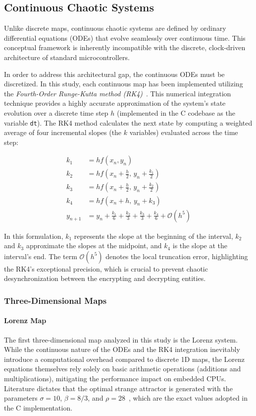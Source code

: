 \documentclass[11pt,a4paper]{report}
\begin{document}
\subsection{Continuous Chaotic Systems}
Unlike discrete maps, continuous chaotic systems are defined by ordinary differential equations (ODEs) that evolve seamlessly over continuous time. 
This conceptual framework is inherently incompatible with the discrete, clock-driven architecture of standard microcontrollers.

In order to address this architectural gap, the continuous ODEs must be discretized. In this study, each continuous map has been implemented utilizing the \textit{Fourth-Order Runge-Kutta method (RK4)}~\cite[p. 711]{KR4}. 
This numerical integration technique provides a highly accurate approximation of the system's state evolution over a discrete time step $h$ (implemented in the C codebase as the variable \texttt{dt}). 
The RK4 method calculates the next state by computing a weighted average of four incremental slopes (the $k$ variables) evaluated across the time step:

\begin{align}
    k_1 &= h f(x_n, y_n) \nonumber \\
    k_2 &= h f\!\left(x_n + \frac{h}{2},\, y_n + \frac{k_1}{2}\right) \nonumber \\
    k_3 &= h f\!\left(x_n + \frac{h}{2},\, y_n + \frac{k_2}{2}\right) \nonumber \\
    k_4 &= h f(x_n + h,\, y_n + k_3) \nonumber \\
    y_{n+1} &= y_n + \frac{k_1}{6} + \frac{k_2}{3} + \frac{k_3}{3} + \frac{k_4}{6} + \mathcal{O}(h^5)
    \label{eq:rk4}
\end{align}

In this formulation, $k_1$ represents the slope at the beginning of the interval, $k_2$ and $k_3$ approximate the slopes at the midpoint, and $k_4$ is the slope at the interval's end. 
The term $\mathcal{O}(h^5)$ denotes the local truncation error, highlighting the RK4's exceptional precision, which is crucial to prevent chaotic desynchronization between the encrypting and decrypting entities.

\subsubsection{Three-Dimensional Maps}

\paragraph{Lorenz Map}
The first three-dimensional map analyzed in this study is the Lorenz system. 
While the continuous nature of the ODEs and the RK4 integration inevitably introduce a computational overhead compared to discrete 1D maps, the Lorenz equations themselves rely solely on basic arithmetic operations (additions and multiplications), 
mitigating the performance impact on embedded CPUs. Literature dictates that the optimal strange attractor is generated with the parameters $\sigma = 10$, $\beta = 8/3$, and $\rho = 28$~\cite{lorenzDefaultParameters}, which are the exact values adopted in the C implementation.
\end{document}
